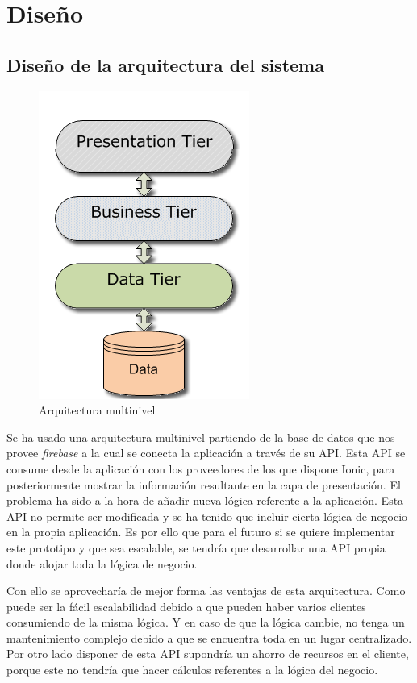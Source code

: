 \section{Diseño}
\subsection{Diseño de la arquitectura del sistema}

\begin{figure}[!h]
    \centering
    \includegraphics[]{images/multilevel-architecture.png}
    \caption{Arquitectura multinivel}
    \label{multilevel-architecture}
\end{figure}

Se ha usado una arquitectura multinivel partiendo de la base de datos que nos provee
\textit{firebase} a la cual se conecta la aplicación a través de su API. Esta API
se consume desde la aplicación con los proveedores de los que dispone Ionic, para
posteriormente mostrar la información resultante en la capa de presentación.
El problema ha sido a la hora de añadir nueva lógica referente a la aplicación.
Esta API no permite ser modificada y se ha tenido que incluir cierta lógica de
negocio en la propia aplicación. Es por ello que para el futuro si se quiere
implementar este prototipo y que sea escalable, se tendría que desarrollar una
API propia donde alojar toda la lógica de negocio.

\medskip
Con ello se aprovecharía de mejor forma las ventajas de esta arquitectura. Como
puede ser la fácil escalabilidad debido a que pueden haber varios clientes
consumiendo de la misma lógica. Y en caso de que la lógica cambie, no tenga un
mantenimiento complejo debido a que se encuentra toda en un lugar centralizado.
Por otro lado disponer de esta API supondría un ahorro de recursos en el cliente,
porque este no tendría que hacer cálculos referentes a la lógica del negocio.

